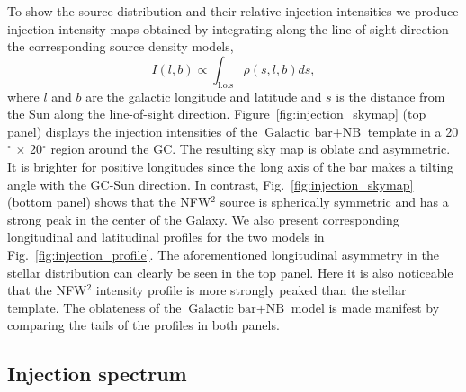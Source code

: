 \documentclass[%
reprint,
superscriptaddress,
amsmath,amssymb,
aps,
floatfix,
]{revtex4-1}
\begin{document}
To show the source distribution and their relative injection intensities we produce injection intensity maps obtained by integrating along the line-of-sight direction the corresponding source density models,
\begin{equation}
  \label{eq:j_factor}
  I(l,b) \propto \int_{\text{l.o.s}} \rho(s,l,b) ds,
\end{equation}
where $l$ and $b$ are the galactic longitude and latitude and $s$ is the distance from the Sun along the line-of-sight direction.
Figure~\ref{fig:injection_skymap} (top panel) displays the injection intensities of the $\mbox{Galactic bar}+\mbox{NB}$ template in a 20$^\circ$ $\times$ 20$^\circ$ region around the GC. The resulting sky map is oblate and asymmetric. It is brighter for positive longitudes since the long axis of the bar makes a tilting angle with the GC-Sun direction. In contrast, Fig.~\ref{fig:injection_skymap} (bottom panel) shows that the NFW$^2$ source is spherically symmetric and has a strong peak in the center of the Galaxy. We also present corresponding longitudinal and latitudinal profiles for the two models in Fig.~\ref{fig:injection_profile}. The aforementioned longitudinal asymmetry in the stellar distribution can clearly be seen in the top panel. Here it is also noticeable that the NFW$^2$ intensity profile is more strongly peaked than the stellar template. The oblateness of the $\mbox{Galactic bar}+\mbox{NB}$ model is made manifest by comparing the tails of the profiles in both panels.

\subsection{Injection spectrum}\label{sec:spectrum}
\end{document}
